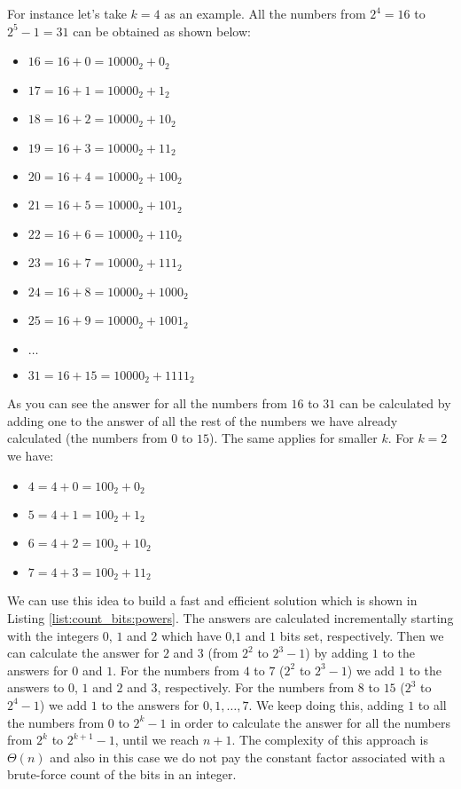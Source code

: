 For instance let's take $k=4$ as an example. All the numbers from $2^4 = 16$ to $2^5-1 = 31$ can be
obtained as shown below:
\begin{itemize}
	\item $16 = 16+0 = 10000_2+ 0_2$
	\item $17 = 16+1 = 10000_2+ 1_2$
	\item $18 = 16+2 = 10000_2+ 10_2$
	\item $19 = 16+3 = 10000_2+ 11_2$
	\item $20 = 16+4 = 10000_2+ 100_2$
	\item $21 = 16+5 = 10000_2+ 101_2$
	\item $22 = 16+6 = 10000_2+ 110_2$
	\item $23 = 16+7 = 10000_2+ 111_2$
	\item $24 = 16+8 = 10000_2+ 1000_2$
	\item $25 = 16+9 = 10000_2+ 1001_2$
	\item $\ldots$
	\item $31 = 16+15 = 10000_2+ 1111_2$
\end{itemize}
As you can see the answer for all the numbers from $16$ to $31$ can be calculated by adding one to
the answer of all the rest of the numbers we have already calculated (the numbers from $0$ to $15$).
The same applies for smaller $k$. For $k=2$ we have:
\begin{itemize}
	\item $4 = 4+0 = 100_2+ 0_2$
	\item $5 = 4+1 = 100_2+ 1_2$
	\item $6 = 4+2 = 100_2+ 10_2$
	\item $7 = 4+3 = 100_2+ 11_2$
\end{itemize}
We can use this idea to build a fast and efficient solution which is shown in Listing \ref{list:count_bits:powers}.
The answers are calculated incrementally starting with the integers $0$, $1$ and $2$ which have $0$,$1$ and
$1$ bits set, respectively.
Then we can calculate the answer for $2$ and $3$ (from $2^2$ to $2^3-1$)
by adding $1$ to the answers for $0$ and $1$.
For the numbers from $4$ to $7$ ($2^2$ to $2^3-1$) we
add $1$ to the answers to $0$, $1$ and $2$ and $3$, respectively.
For the numbers from $8$ to $15$ ($2^3$ to
$2^4-1$) we add $1$ to the answers for $0, 1, \ldots,7$.
We keep doing this, adding $1$ to all the
numbers from $0$ to $2^k-1$ in order to calculate the answer for all the numbers from $2^k$ to
$2^{k+1}-1$, until we reach $n+1$.
The complexity of this approach is $\Theta(n)$ and also in this
case we do not pay the constant factor associated with a brute-force count of the bits in an
integer.


